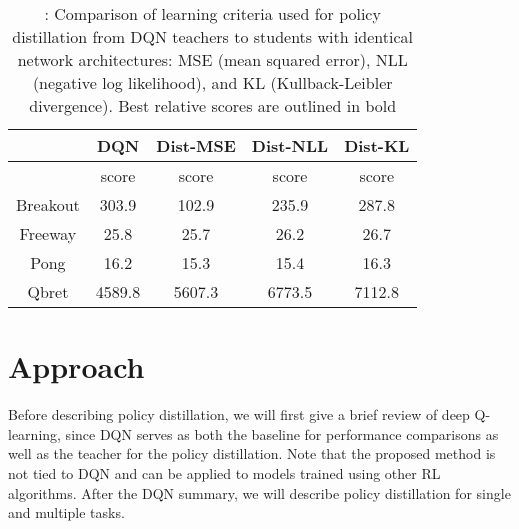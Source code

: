 \documentclass[30pt,twocolumn,letterpaper]{article}
\begin{document}
\begin{table}
\begin{center}
\begin{tabular}{ccccc}
\toprule
         & DQN  &Dist-MSE&Dist-NLL&Dist-KL\\
\midrule
         &score &score   &score   &score\\
 Breakout&303.9 &102.9   &235.9   &287.8\\
 Freeway &25.8  &25.7    &26.2    &26.7\\
 Pong    &16.2  &15.3    &15.4    &16.3\\
 Qbret   &4589.8&5607.3  &6773.5  &7112.8\\
 \bottomrule
\end{tabular}
\end{center}
\caption{: Comparison of learning criteria used for policy distillation from DQN teachers to students with identical
network architectures: MSE (mean squared error), NLL (negative log likelihood), and KL (Kullback-Leibler
divergence). Best relative scores are outlined in bold}
\end{table}
\section{Approach}
Before describing policy distillation, we will first give a brief review of deep Q-learning, since DQN serves as both the baseline for performance comparisons as well as the teacher for the policy distillation. Note that the proposed method is not tied to DQN and can be applied to models trained using other RL algorithms. After the DQN summary, we will describe policy distillation for single and multiple tasks\cite{ZHANG2006A}.
{\small


}
\end{document}
